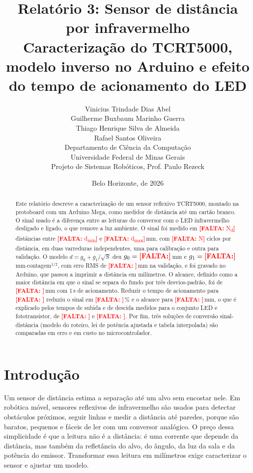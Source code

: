 \documentclass[11pt,a4paper]{article}
\title{\textbf{Relatório 3: Sensor de distância por infravermelho}\\
[0.4em]
\large Caracterização do TCRT5000, modelo inverso no Arduino e efeito do tempo de acionamento do LED
}
\author{
Vinicius Trindade Dias Abel \\
Guilherme Buxbaum Marinho Guerra \\
Thiago Henrique Silva de Almeida \\
Rafael Santos Oliveira \\[0.8em]
\small Departamento de Ciência da Computação \\
\small Universidade Federal de Minas Gerais \\
\small Projeto de Sistemas Robóticos, Prof. Paulo Rezeck
}
\date{Belo Horizonte, \pendente{data de envio} de 2026}
\newcommand{\pendente}[1]{\textcolor{red}{\textbf{[FALTA:} #1\textbf{]}}}
\begin{document}
\maketitle

\begin{abstract}
\noindent
Este relatório descreve a caracterização de um sensor reflexivo TCRT5000, montado na protoboard com um Arduino Mega, como medidor de distância até um cartão branco. O sinal usado é a diferença entre as leituras do conversor com o LED infravermelho desligado e ligado, o que remove a luz ambiente. O sinal foi medido em \pendente{N\textsubscript{d}} distâncias entre \pendente{d\textsubscript{min}} e \pendente{d\textsubscript{max}}\,mm, com \pendente{N} ciclos por distância, em duas varreduras independentes, uma para calibração e outra para validação. O modelo $d = g_0 + g_1/\sqrt{S}$ deu $g_0 = \pendente{}$\,mm e $g_1 = \pendente{}$\,mm$\cdot$contagem$^{1/2}$, com erro RMS de \pendente{}\,mm na validação, e foi gravado no Arduino, que passou a imprimir a distância em milímetros. O alcance, definido como a maior distância em que o sinal se separa do fundo por três desvios-padrão, foi de \pendente{}\,mm com 1\,s de acionamento. Reduzir o tempo de acionamento para \pendente{} reduziu o sinal em \pendente{}\,\% e o alcance para \pendente{}\,mm, o que é explicado pelos tempos de subida e de descida medidos para o conjunto LED e fototransistor, de \pendente{} e \pendente{}. Por fim, três soluções de conversão sinal-distância (modelo do roteiro, lei de potência ajustada e tabela interpolada) são comparadas em erro e em custo no microcontrolador.
\end{abstract}

\setcounter{tocdepth}{2}
\tableofcontents

\section{Introdução}
\label{sec:introducao}

Um sensor de distância estima a separação até um alvo sem encostar nele. Em robótica móvel, sensores reflexivos de infravermelho são usados para detectar obstáculos próximos, seguir linhas e medir a distância até paredes, porque são baratos, pequenos e fáceis de ler com um conversor analógico. O preço dessa simplicidade é que a leitura não é a distância: é uma corrente que depende da distância, mas também da refletância do alvo, do ângulo, da luz da sala e da potência do emissor. Transformar essa leitura em milímetros exige caracterizar o sensor e ajustar um modelo.
\end{document}
